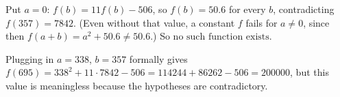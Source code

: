 Put $a=0$: $f(b)=11f(b)-506$, so $f(b)=50.6$ for every $b$, contradicting $f(357)=7842$. (Even without that value, a constant $f$ fails for $a\ne0$, since then $f(a+b)=a^2+50.6\ne50.6$.) So $\boxed{\text{no such function exists}}$.

Plugging in $a=338$, $b=357$ formally gives $f(695)=338^2+11\cdot7842-506=114244+86262-506=200000$, but this value is meaningless because the hypotheses are contradictory.
